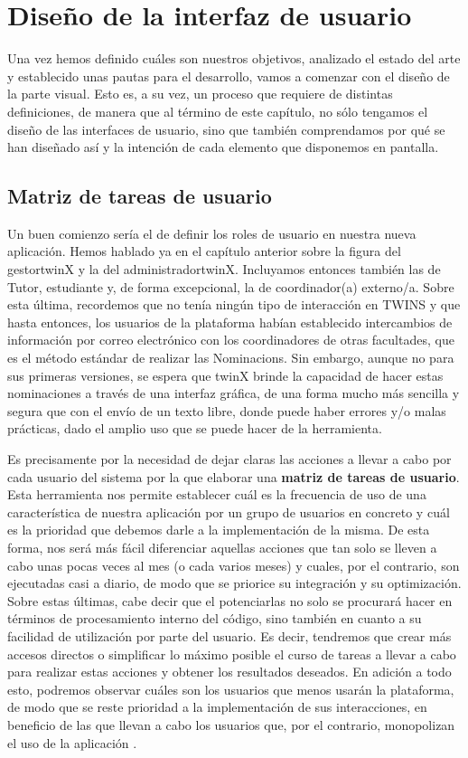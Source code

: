 \chapter{Diseño de la interfaz de usuario}

Una vez hemos definido cuáles son nuestros objetivos, analizado el estado del arte y establecido unas pautas para el desarrollo, vamos a comenzar con el diseño de la parte visual. Esto es, a su vez, un proceso que requiere de distintas definiciones, de manera que al término de este capítulo, no sólo tengamos el diseño de las interfaces de usuario, sino que también comprendamos por qué se han diseñado así y la intención de cada elemento que disponemos en pantalla.

\section{Matriz de tareas de usuario}

Un buen comienzo sería el de definir los roles de usuario en nuestra nueva aplicación. Hemos hablado ya en el capítulo anterior sobre la figura del \gls{gestortwinX} y la del \gls{administradortwinX}. Incluyamos entonces también las de \gls{Tutor}, estudiante y, de forma excepcional, la de coordinador(a) externo/a. Sobre esta última, recordemos que no tenía ningún tipo de interacción en TWINS y que hasta entonces, los usuarios de la plataforma habían establecido intercambios de información por correo electrónico con los coordinadores de otras facultades, que es el método estándar de realizar las \glspl{Nominacion}. Sin embargo, aunque no para sus primeras versiones, se espera que twinX brinde la capacidad de hacer estas nominaciones a través de una interfaz gráfica, de una forma mucho más sencilla y segura que con el envío de un texto libre, donde puede haber errores y/o malas prácticas, dado el amplio uso que se puede hacer de la herramienta.

Es precisamente por la necesidad de dejar claras las acciones a llevar a cabo por cada usuario del sistema por la que elaborar una \textbf{matriz de tareas de usuario}. Esta herramienta nos permite establecer cuál es la frecuencia de uso de una característica de nuestra aplicación por un grupo de usuarios en concreto y cuál es la prioridad que debemos darle a la implementación de la misma. De esta forma, nos será más fácil diferenciar aquellas acciones que tan solo se lleven a cabo unas pocas veces al mes (o cada varios meses) y cuales, por el contrario, son ejecutadas casi a diario, de modo que se priorice su integración y su optimización. Sobre estas últimas, cabe decir que el potenciarlas no solo se procurará hacer en términos de procesamiento interno del código, sino también en cuanto a su facilidad de utilización por parte del usuario. Es decir, tendremos que crear más accesos directos o simplificar lo máximo posible el curso de tareas a llevar a cabo para realizar estas acciones y obtener los resultados deseados. En adición a todo esto, podremos observar cuáles son los usuarios que menos usarán la plataforma, de modo que se reste prioridad a la implementación de sus interacciones, en beneficio de las que llevan a cabo los usuarios que, por el contrario, monopolizan el uso de la aplicación \cite{matrizTareas}.

